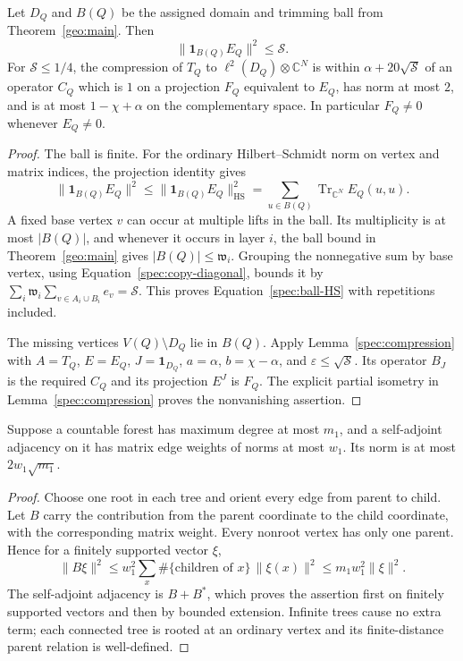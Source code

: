 \begin{lemma}
\label{spec:copy-cut}
Let $D_Q$ and $B(Q)$ be the assigned domain and trimming ball from
Theorem~\ref{geo:main}.  Then
\begin{equation}
             \|\mathbf1_{B(Q)}E_Q\|^2\leq\mathcal S.
 \label{spec:ball-HS}
\end{equation}
For $\mathcal S\leq1/4$, the compression of $T_Q$ to
$\ell^2(D_Q)\otimes\mathbb C^N$ is within
$\alpha+20\sqrt{\mathcal S}$ of an operator $C_Q$ which is $1$ on a
projection $F_Q$ equivalent to $E_Q$, has norm at most $2$, and is at
most $1-\chi+\alpha$ on the complementary space.  In particular
$F_Q\ne0$ whenever $E_Q\ne0$.
\end{lemma}

\begin{proof}
The ball is finite.  For the ordinary Hilbert--Schmidt norm on vertex
and matrix indices, the projection identity gives
\[
 \|\mathbf1_{B(Q)}E_Q\|^2
 \leq\|\mathbf1_{B(Q)}E_Q\|_{\mathrm{HS}}^2
 =\sum_{u\in B(Q)}\operatorname{Tr}_{\mathbb C^N}E_Q(u,u).
\]
A fixed base vertex $v$ can occur at multiple lifts in the ball.  Its
multiplicity is at most $|B(Q)|$, and whenever it occurs in layer $i$,
the ball bound in Theorem~\ref{geo:main} gives
$|B(Q)|\leq\mathfrak w_i$.  Grouping the nonnegative sum by base vertex,
using Equation~\eqref{spec:copy-diagonal}, bounds it by
$\sum_i\mathfrak w_i\sum_{v\in A_i\cup B_i}e_v=\mathcal S$.
This proves Equation~\eqref{spec:ball-HS} with repetitions included.

The missing vertices $V(Q)\setminus D_Q$ lie in $B(Q)$.  Apply
Lemma~\ref{spec:compression} with $A=T_Q$, $E=E_Q$,
$J=\mathbf1_{D_Q}$, $a=\alpha$, $b=\chi-\alpha$, and
$\varepsilon\leq\sqrt{\mathcal S}$.  Its operator $B_J$ is the required
$C_Q$ and its projection $E^J$ is $F_Q$.  The explicit partial isometry
in Lemma~\ref{spec:compression} proves the nonvanishing assertion.
\end{proof}

\begin{lemma}
\label{spec:forest-norm}
Suppose a countable forest has maximum degree at most $m_1$, and a
self-adjoint adjacency on it has matrix edge weights of norms at most
$w_1$.  Its norm is at most $2w_1\sqrt{m_1}$.
\end{lemma}

\begin{proof}
Choose one root in each tree and orient every edge from parent to child.
Let $B$ carry the contribution from the parent coordinate to the child
coordinate, with the corresponding matrix weight.  Every nonroot vertex
has only one parent.  Hence for a finitely supported vector $\xi$,
\[
 \|B\xi\|^2
   \leq w_1^2\sum_x\#\{\text{children of }x\}\,\|\xi(x)\|^2
   \leq m_1w_1^2\|\xi\|^2.
\]
The self-adjoint adjacency is $B+B^*$, which proves the assertion first
on finitely supported vectors and then by bounded extension.  Infinite
trees cause no extra term; each connected tree is rooted at an ordinary
vertex and its finite-distance parent relation is well-defined.
\end{proof}

